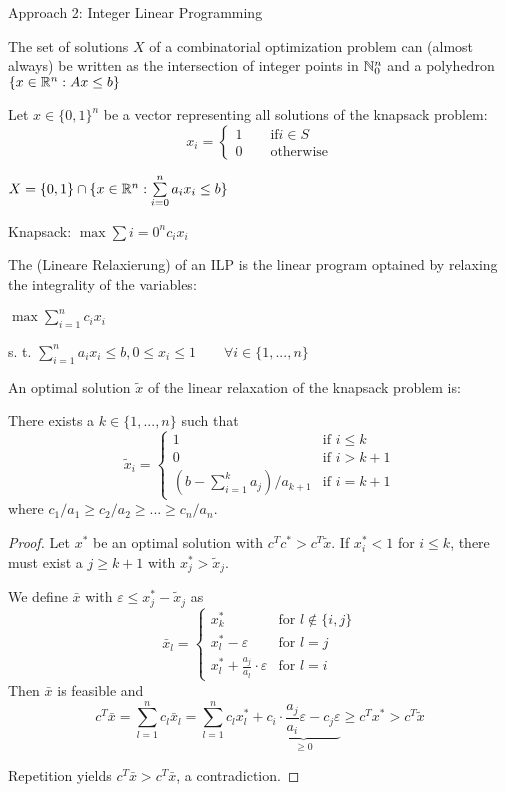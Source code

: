 Approach 2: Integer Linear Programming

The set of solutions $X$ of a combinatorial optimization problem can (almost always) be written as the intersection of integer points in $\mathbb{N}_0^n$ and a polyhedron $\{x \in \mathbb{R}^n: Ax\leq b\}$

Let $x \in \{0,1\}^n$ be a vector representing all solutions of the knapsack problem:
\[
	x_i = \begin{cases}
		1 \qquad \text{if} i \in S \\
		0 \qquad \text{otherwise}
	\end{cases}
\]

$X = \{0,1\} \cap \{ x \in \mathbb{R}^n: \sum\limits_{i = 0}^n a_ix_i\leq b\}$

Knapsack: $\max \sum{i = 0}^n c_i x_i$

The  (Lineare Relaxierung) of an ILP is the linear program optained by relaxing the integrality of the variables:

$\max \sum_{i=1}^n c_i x_i$

s. t. $\sum_{i=1}^n a_i x_i \leq b, 0 \leq x_i \leq 1 \qquad \forall i \in \{1, ..., n\}$

\begin{thm}
An optimal solution $\tilde{x}$ of the linear relaxation of the knapsack
problem is:

There exists a $k \in \{1, ..., n\}$ such that 
\[
\tilde{x}_i = \left \{ \begin{array}{ll}
1 & \text{if } i \leq k \\ 
0 & \text{if } i > k+1 \\
(b-\sum^k_{i=1} a_j) / a_{k+1} & \text{if } i=k+1
\end{array} \right.
\]
where $c_1/a_1 \geq c_2 / a_2 \geq ... \geq c_n / a_n$.
\end{thm}

\begin{proof}
Let $x^*$ be an optimal solution with $c^T c^* > c^T \tilde{x}$.
If $x^*_i < 1$ for $i \leq k$, there must exist a $j \geq k+1$ with $x^*_j >
\tilde{x}_j$.

We define $\bar{x}$ with $\varepsilon \leq x^*_j - \tilde{x}_j$ as
\[
\bar{x}_l = \left \{ \begin{array}{ll}
x^*_k & \text{for } l \not\in \{i, j\} \\
x^*_l - \varepsilon & \text{for } l=j \\
x^*_l + \frac{a_j}{a_l} \cdot \varepsilon & \text{for } l=i
\end{array} \right.
\]
Then $\bar{x}$ is feasible and
\[
c^T \bar{x} = \sum_{l=1}^n c_l \bar{x}_l =
\sum_{l=1}^n c_l x^*_l + \underbrace{c_i \cdot \frac{a_j}{a_i} \varepsilon - c_j
\varepsilon}_{\geq 0} \geq c^T x^* > c^T \tilde{x}
\]

Repetition yields $c^T \bar{x} > c^T \bar{x}$, a contradiction.
\end{proof}

